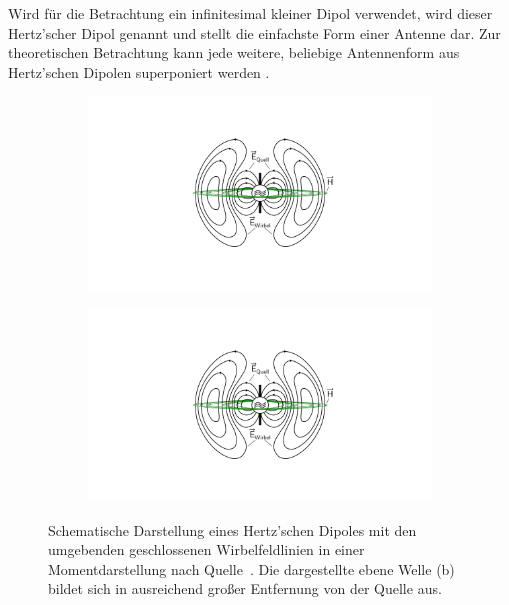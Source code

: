 \par
\vspace{\linespace}
Wird für die Betrachtung ein infinitesimal kleiner Dipol verwendet, wird dieser Hertz'scher Dipol genannt und stellt die einfachste Form einer Antenne dar. Zur theoretischen Betrachtung kann jede weitere, beliebige Antennenform aus Hertz'schen Dipolen superponiert werden \cite{EM_Schirmung}.
\par
\vspace{\linespace}
\begin{figure}
    \centering
    \begin{subfigure}[c]{0.3\textheight}
        \includegraphics[page = 1, width=\textwidth, trim = 10cm 4cm 9.5cm 4cm, clip]{Abbildungen/Kapitel2/Hertz-Dipol.pdf}
        \caption{}\label{subfig:2_Hertzscher_Dipol_A}
    \end{subfigure}
    \hspace{1cm}
    \begin{subfigure}[c]{0.3\textheight}
        \includegraphics[page = 2, width=\textwidth, trim = 4.5cm 0cm 8cm 0cm, clip]{Abbildungen/Kapitel2/Hertz-Dipol.pdf}
        \caption{}\label{subfig:2_Hertzscher_Dipol_B}
    \end{subfigure}
    \caption{Schematische Darstellung eines Hertz'schen Dipoles mit den umgebenden geschlossenen Wirbelfeldlinien in einer Momentdarstellung nach Quelle~\cite{EM_Schirmung}. Die dargestellte ebene Welle (b) bildet sich in ausreichend großer Entfernung von der Quelle aus.}
    \label{fig:2_Hertzscher_Dipol}
\end{figure}


